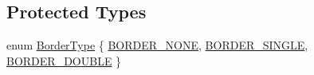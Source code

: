 \subsection*{Protected Types}
\begin{DoxyCompactItemize}
\item 
enum \hyperlink{classmts_component_viewer_a2bd239a01fe3124526c4322e7305b99f}{Border\+Type} \{ \hyperlink{classmts_component_viewer_a2bd239a01fe3124526c4322e7305b99fa052b7b827ea4321a586d118000c4a552}{B\+O\+R\+D\+E\+R\+\_\+\+N\+O\+N\+E}, 
\hyperlink{classmts_component_viewer_a2bd239a01fe3124526c4322e7305b99faf0a34a78342afbf7f576922058838128}{B\+O\+R\+D\+E\+R\+\_\+\+S\+I\+N\+G\+L\+E}, 
\hyperlink{classmts_component_viewer_a2bd239a01fe3124526c4322e7305b99fab167f9fc9c912e6defea2768f25305b9}{B\+O\+R\+D\+E\+R\+\_\+\+D\+O\+U\+B\+L\+E}
 \}
\end{DoxyCompactItemize}
